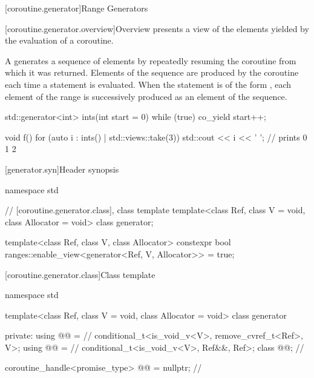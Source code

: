 \documentclass{wg21}
\begin{document}
\begin{addedblock}
[coroutine.generator]{Range Generators}

[coroutine.generator.overview]{Overview}
 presents a view of the elements yielded
by the evaluation of a coroutine.

A  generates a sequence of elements by
repeatedly resuming the coroutine from which it was returned.
Elements of the sequence are produced by the coroutine
each time a  statement is evaluated.
When the  statement is of the form
,
each element of the range 
is successively produced
as an element of the sequence.

\begin{example}
    \begin{codeblock}
        std::generator<int> ints(int start = 0) {
            while (true)
                co_yield start++;
        }

        void f() {
            for (auto i : ints() | std::views::take(3))
                std::cout << i << ' '; // prints 0 1 2
        }
    \end{codeblock}
\end{example}

[generator.syn]{Header  synopsis}

\begin{codeblock}
namespace std {
  // [coroutine.generator.class], class template 
  template<class Ref, class V = void, class Allocator = void>
  class generator;

  template<class Ref, class V, class Allocator>
  constexpr bool ranges::enable_view<generator<Ref, V, Allocator>> = true;
}
\end{codeblock}

[coroutine.generator.class]{Class template }

\begin{codeblock}
namespace std {
  template<class Ref, class V = void, class Allocator = void>
  class generator {
  private:
    using @@ =       // \expos
      conditional_t<is_void_v<V>, remove_cvref_t<Ref>, V>;
    using @@ =   // \expos
      conditional_t<is_void_v<V>, Ref&&, Ref>;
    class @@;     // \expos

    coroutine_handle<promise_type> @@ = nullptr; // \expos

}}
\end{codeblock}
\end{addedblock}
\end{document}
